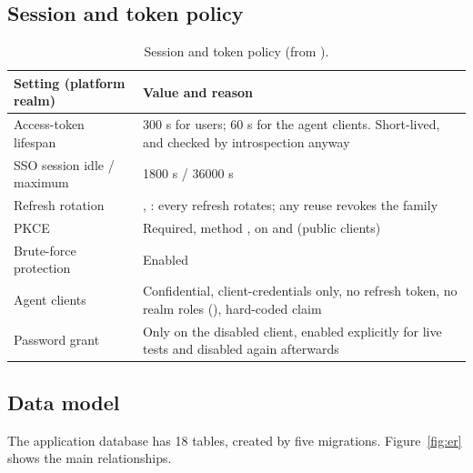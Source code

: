\subsection{Session and token policy}
\begin{table}[H]
\centering
\small
\begin{tabularx}{\textwidth}{@{}P{5.2cm} L@{}}
\toprule
\textbf{Setting (platform realm)} & \textbf{Value and reason}\\
\midrule
Access-token lifespan & 300 s for users; 60 s for the agent clients. Short-lived, and checked by introspection anyway\\
SSO session idle / maximum & 1800 s / 36000 s\\
Refresh rotation & , : every refresh rotates; any reuse revokes the family\\
PKCE & Required, method , on  and  (public clients)\\
Brute-force protection & Enabled\\
Agent clients & Confidential, client-credentials only, no refresh token, no realm roles (), hard-coded claim \\
Password grant & Only on the disabled  client, enabled explicitly for live tests and disabled again afterwards\\
\bottomrule
\end{tabularx}
\caption{Session and token policy (from ).}
\end{table}

\subsection{Data model}
The application database has 18 tables, created by five migrations. Figure~\ref{fig:er} shows the main relationships.

